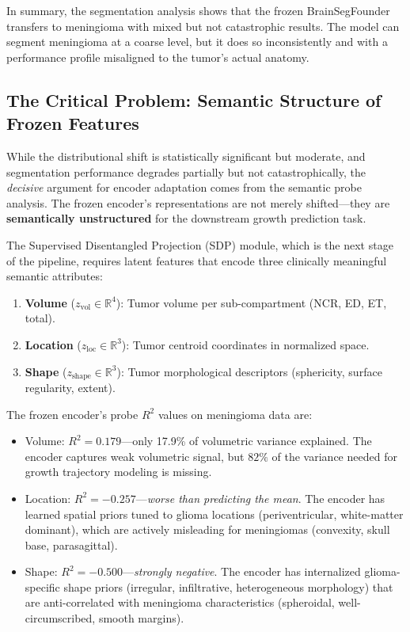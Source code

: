 \documentclass[11pt,a4paper]{article}
\newcommand{\R}{\mathbb{R}}
\theoremstyle{definition}
\begin{document}
In summary, the segmentation analysis shows that the frozen BrainSegFounder transfers to meningioma with mixed but not catastrophic results. The model can segment meningioma at a coarse level, but it does so inconsistently and with a performance profile misaligned to the tumor's actual anatomy.

\subsection{The Critical Problem: Semantic Structure of Frozen Features}\label{sec:semantic-structure}

While the distributional shift is statistically significant but moderate, and segmentation performance degrades partially but not catastrophically, the \emph{decisive} argument for encoder adaptation comes from the semantic probe analysis. The frozen encoder's representations are not merely shifted---they are \textbf{semantically unstructured} for the downstream growth prediction task.

The Supervised Disentangled Projection (SDP) module, which is the next stage of the pipeline, requires latent features that encode three clinically meaningful semantic attributes:
\begin{enumerate}[nosep]
  \item \textbf{Volume} ($z_\text{vol} \in \R^4$): Tumor volume per sub-compartment (NCR, ED, ET, total).
  \item \textbf{Location} ($z_\text{loc} \in \R^3$): Tumor centroid coordinates in normalized space.
  \item \textbf{Shape} ($z_\text{shape} \in \R^3$): Tumor morphological descriptors (sphericity, surface regularity, extent).
\end{enumerate}

The frozen encoder's probe $R^2$ values on meningioma data are:
\begin{itemize}[nosep]
  \item Volume: $R^2 = 0.179$---only 17.9\% of volumetric variance explained. The encoder captures weak volumetric signal, but $82\%$ of the variance needed for growth trajectory modeling is missing.
  \item Location: $R^2 = -0.257$---\emph{worse than predicting the mean}. The encoder has learned spatial priors tuned to glioma locations (periventricular, white-matter dominant), which are actively misleading for meningiomas (convexity, skull base, parasagittal).
  \item Shape: $R^2 = -0.500$---\emph{strongly negative}. The encoder has internalized glioma-specific shape priors (irregular, infiltrative, heterogeneous morphology) that are anti-correlated with meningioma characteristics (spheroidal, well-circumscribed, smooth margins).
\end{itemize}
\end{document}
